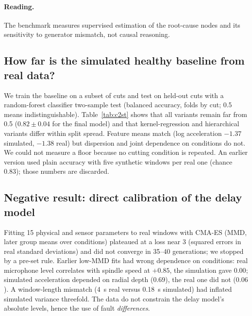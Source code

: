 \documentclass[11pt]{article}
\begin{document}
\paragraph{Reading.} The benchmark measures supervised estimation of the root-cause nodes and its sensitivity to generator mismatch, not causal reasoning.

\subsection{How far is the simulated healthy baseline from real data?}\label{sec:healthy}
We train the baseline on a subset of cuts and test on held-out cuts with a random-forest classifier two-sample test (balanced accuracy, folds by cut; 0.5 means indistinguishable). Table~\ref{tab:c2st} shows that all variants remain far from 0.5 ($0.82\pm0.04$ for the final model) and that kernel-regression and hierarchical variants differ within split spread. Feature means match (log acceleration $-1.37$ simulated, $-1.38$ real) but dispersion and joint dependence on conditions do not. We could not measure a floor because no cutting condition is repeated. An earlier version used plain accuracy with five synthetic windows per real one (chance 0.83); those numbers are discarded.
\begin{table}[t]\centering\small
\caption{Classifier two-sample test, real versus simulated healthy windows on held-out cuts; mean $\pm$ s.d.\ over random stratified splits.}\label{tab:c2st}

\end{table}

\subsection{Negative result: direct calibration of the delay model}\label{sec:neg}
Fitting 15 physical and sensor parameters to real windows with CMA-ES (MMD, later group means over conditions) plateaued at a loss near 3 (squared errors in real standard deviations) and did not converge in 35--40 generations; we stopped by a pre-set rule. Earlier low-MMD fits had wrong dependence on conditions: real microphone level correlates with spindle speed at $+0.85$, the simulation gave $0.00$; simulated acceleration depended on radial depth ($0.69$), the real one did not ($0.06$). A window-length mismatch (4~s real versus 0.18~s simulated) had inflated simulated variance threefold. The data do not constrain the delay model's absolute levels, hence the use of fault \emph{differences}.
\end{document}
